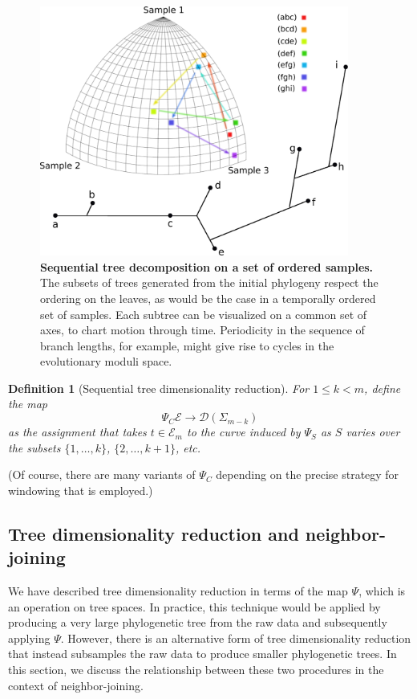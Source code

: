 \documentclass[a4paper,11pt]{article}
\newtheorem{definition}{Definition}
\newcommand{\aD}{\mathcal{D}}
\newcommand{\aE}{\mathcal{E}}
\begin{document}
\begin{figure}
    \centering
    \includegraphics[width=4in]{../figures/dimred_def4.pdf}
    \caption{{\bf Sequential tree decomposition on a set of ordered samples.} The subsets of trees generated from the initial phylogeny respect the ordering on the leaves, as would be the case in a temporally ordered set of samples. Each subtree can be visualized on a common set of axes, to chart motion through time. Periodicity in the sequence of branch lengths, for example, might give rise to cycles in the evolutionary moduli space.}
    \label{fig:dimred_def4}
\end{figure} 

\begin{definition}[Sequential tree dimensionality reduction]
For $1 \leq k < m$, define the map
\[
\Psi_C \aE \to \aD(\Sigma_{m-k})
\]
as the assignment that takes $t \in \aE_m$ to the curve induced by $\Psi_S$ as $S$ varies over the subsets $\{1, \ldots, k\}$, $\{2, \ldots, k+1\}$, etc.
\end{definition}

(Of course, there are many variants of $\Psi_C$ depending on the precise strategy for windowing that is employed.)

\subsection{Tree dimensionality reduction and neighbor-joining}

We have described tree dimensionality reduction in terms of the map $\Psi$, which is an operation on tree spaces.
In practice, this technique would be applied by producing a very large phylogenetic tree from the raw data and subsequently applying $\Psi$.
However, there is an alternative form of tree dimensionality reduction that instead subsamples the raw data to produce smaller phylogenetic trees.
In this section, we discuss the relationship between these two procedures in the context of neighbor-joining.
\end{document}
